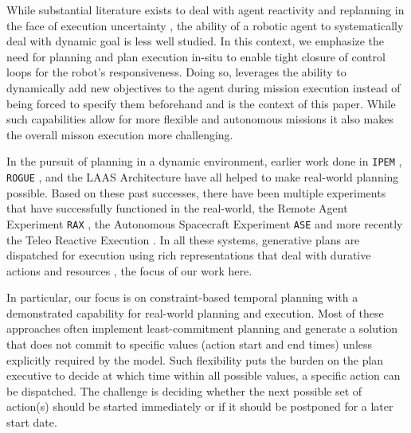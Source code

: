 While substantial literature exists to deal with agent reactivity and
replanning in the face of execution uncertainty , the ability of a robotic agent to systematically deal with
dynamic goal is less well studied. In this context, we emphasize the
need for planning and plan execution in-situ to enable tight closure
of control loops for the robot's responsiveness.
Doing so, leverages the ability to dynamically add new objectives to
the agent during mission execution instead of being forced to specify
them beforehand and is the context of this paper.  While such
capabilities allow for more flexible and autonomous missions it also
makes the overall misson execution more challenging.

In the pursuit of planning in a dynamic environment, earlier work done
in \texttt{IPEM} \cite{AmbrosIngerson88}, \texttt{ROGUE}
\cite{Haigh98}, and the LAAS Architecture \cite{alami:1998p820} have
all helped to make real-world planning possible. Based on these past
successes, there have been multiple experiments that have successfully
functioned in the real-world, the Remote Agent Experiment \texttt{RAX}
\cite{mus98}, the Autonomous Spacecraft Experiment \texttt{ASE}
\cite{chien99} and more recently the Teleo Reactive Execution \rxe
\cite{mcgann08b,py10}. In all these systems, generative plans are
dispatched for execution using rich representations that deal with
durative actions and resources \cite{lemai04}, the focus of our work
here.

In particular, our focus is on constraint-based temporal planning
\cite{frank2003,lemai04} with a demonstrated capability for real-world
planning and execution.
Most of these approaches often implement  least-commitment 
planning and generate a solution that does not commit to specific 
values (\eg action start and end
times) unless explicitly required by the model. Such flexibility puts
the burden on the plan executive to decide at which time within all
possible values, a specific action can be  dispatched. 
The challenge is deciding whether the next possible set of action(s)
should be started immediately or if it should be postponed for a later
start date.

